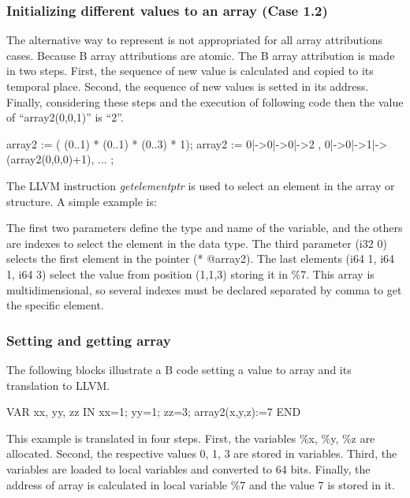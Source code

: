 \documentclass{llncs}
\begin{document}
\subsubsection{Initializing different values to an array (Case 1.2) }
The alternative way to represent is not appropriated for all array attributions cases. 
Because B array attributions are atomic. The B array 
attribution is made in two steps. First, the sequence of new value is calculated and
copied to its temporal place. Second, the sequence of new values is setted 
in its address. Finally, considering these steps and the execution of
following code then the value of ``array2(0,0,1)'' is ``2''.

\begin{pascalcode}
 array2 := ( (0..1) * (0..1) * (0..3) * {1});
 array2 := { 0|->0|->0|->2 , 0|->0|->1|->(array2(0,0,0)+1), ...  };
\end{pascalcode}

The LLVM instruction \textit{getelementptr} is used to select an element in
the array or structure. A simple example is: 

\begin{llvmcode}
\end{llvmcode}


The first two parameters define the type and name of the variable, and the
others are indexes to select the element in the data type. The third parameter (i32 0)
selects the first element in the pointer (* @array2). The last elements 
(i64 1, i64 1, i64 3) select the value from position (1,1,3) storing it in \%7.
This array is multidimensional, so several indexes must be declared separated
by comma to get the specific element.

\subsubsection{Setting and getting array}

The following blocks illustrate a B code setting a value to array
and its translation to LLVM. 

\begin{pascalcode} 
VAR xx, yy, zz IN
	xx=1;
	yy=1;
	zz=3;
	array2(x,y,z):=7
END
\end{pascalcode}

This example is translated in four steps. First, the variables \%x, \%y, \%z 
are allocated. Second, the respective values 0, 1, 3 are stored in variables. 
Third, the variables are loaded to local variables and converted to 64 bits. 
Finally, the address of array is calculated in local variable \%7 and the value 
7 is stored in it.  
\end{document}
